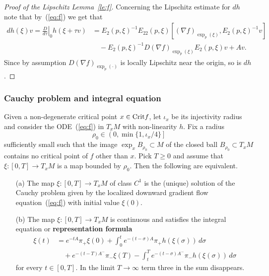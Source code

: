 \documentclass{article}
\begin{document}
\begin{proof}[Proof of the Lipschitz Lemma~\ref{le:f}]
Concerning the Lipschitz estimate for $dh$ note that
by~(\ref{eq:f}) we get that
\begin{equation*}
\begin{split}
     dh(\xi)v=\left.\tfrac{D}{d\tau}\right|_0 h(\xi+\tau v)
   &=E_2(p,\xi)^{-1}E_{22}(p,\xi)
     \left[(\nabla f)_{\exp_p(\xi)},E_2(p,\xi)^{-1}v\right]
     \\
   &\quad
     -E_2(p,\xi)^{-1} D(\nabla f)_{\exp_p(\xi)} E_2(p,\xi) v +Av.
\end{split}
\end{equation*}
Since by assumption $D(\nabla f)_{\exp_p(\cdot)}$ is locally Lipschitz near the origin, so is $dh$.
\end{proof}


\subsubsection*{Cauchy problem and integral equation}%
\begin{proposition}\label{prop:representation-formula}
    Given a non-degenerate critical point $x\in{\rm Crit} f$, let $\iota_x$ be
    its injectivity radius and consider the ODE~(\ref{eq:f})
    in $T_xM$ with non-linearity $h$. Fix a radius
    \begin{equation}\label{eq:rho_0}
        \rho_0\in\left(0,\min\{1,\iota_x/4\}\right]
    \end{equation}
    sufficiently small such that the image
    $\exp_x B_{\rho_0}\subset M$ of the closed
    ball $B_{\rho_0}\subset T_xM$
    contains no critical point of $f$ other than $x$.
    Pick $T\ge0$ and assume that
    $\xi:[0,T]\to T_xM$ is a map bounded by $\rho_0$.
    Then the following are equivalent. 
\begin{enumerate}
  \item[\rm (a)] 
    The map $\xi:[0,T]\to T_xM$ of class $C^1$ is the
    (unique) solution of the Cauchy problem given by
    the localized downward gradient flow
    equation~(\ref{eq:f}) with initial value $\xi(0)$.

  \item[\rm (b)]
    The map $\xi:[0,T]\to T_xM$ is
    continuous and satisfies the integral equation
    or {\bf representation formula}
    \begin{equation}\label{eq:representation-formula}
    \begin{split}
      \xi(t) 
     &=e^{-tA}\pi_+ \xi(0)
      +\int_0^t e^{-(t-\sigma)A}
      \pi_+h(\xi(\sigma))\, d\sigma
      \\
     &\quad
      +e^{-(t-T)A^-}\pi_- \xi(T)
      -\int_t^T e^{-(t-\sigma)A^-}
      \pi_-h(\xi(\sigma))\, d\sigma
    \end{split}
    \end{equation}
    for every $t\in[0,T]$.
    In the limit $T\to\infty$ term three in the sum
    disappears.
\end{enumerate}
\end{proposition}
\end{document}
